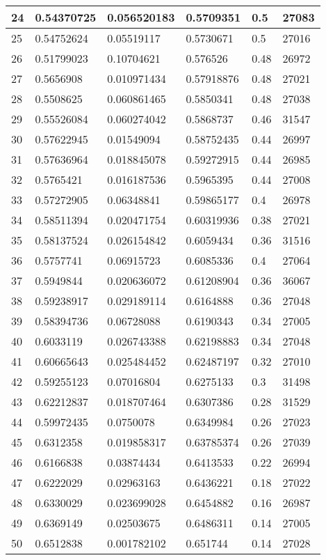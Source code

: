 \begin{longtable}{|l|l|l|l|l|l|}
24 & 0.54370725 & 0.056520183 & 0.5709351 & 0.5 & 27083 \\ \hline 
25 & 0.54752624 & 0.05519117 & 0.5730671 & 0.5 & 27016 \\ \hline 
26 & 0.51799023 & 0.10704621 & 0.576526 & 0.48 & 26972 \\ \hline 
27 & 0.5656908 & 0.010971434 & 0.57918876 & 0.48 & 27021 \\ \hline 
28 & 0.5508625 & 0.060861465 & 0.5850341 & 0.48 & 27038 \\ \hline 
29 & 0.55526084 & 0.060274042 & 0.5868737 & 0.46 & 31547 \\ \hline 
30 & 0.57622945 & 0.01549094 & 0.58752435 & 0.44 & 26997 \\ \hline 
31 & 0.57636964 & 0.018845078 & 0.59272915 & 0.44 & 26985 \\ \hline 
32 & 0.5765421 & 0.016187536 & 0.5965395 & 0.44 & 27008 \\ \hline 
33 & 0.57272905 & 0.06348841 & 0.59865177 & 0.4 & 26978 \\ \hline 
34 & 0.58511394 & 0.020471754 & 0.60319936 & 0.38 & 27021 \\ \hline 
35 & 0.58137524 & 0.026154842 & 0.6059434 & 0.36 & 31516 \\ \hline 
36 & 0.5757741 & 0.06915723 & 0.6085336 & 0.4 & 27064 \\ \hline 
37 & 0.5949844 & 0.020636072 & 0.61208904 & 0.36 & 36067 \\ \hline 
38 & 0.59238917 & 0.029189114 & 0.6164888 & 0.36 & 27048 \\ \hline 
39 & 0.58394736 & 0.06728088 & 0.6190343 & 0.34 & 27005 \\ \hline 
40 & 0.6033119 & 0.026743388 & 0.62198883 & 0.34 & 27048 \\ \hline 
41 & 0.60665643 & 0.025484452 & 0.62487197 & 0.32 & 27010 \\ \hline 
42 & 0.59255123 & 0.07016804 & 0.6275133 & 0.3 & 31498 \\ \hline 
43 & 0.62212837 & 0.018707464 & 0.6307386 & 0.28 & 31529 \\ \hline 
44 & 0.59972435 & 0.0750078 & 0.6349984 & 0.26 & 27023 \\ \hline 
45 & 0.6312358 & 0.019858317 & 0.63785374 & 0.26 & 27039 \\ \hline 
46 & 0.6166838 & 0.03874434 & 0.6413533 & 0.22 & 26994 \\ \hline 
47 & 0.6222029 & 0.02963163 & 0.6436221 & 0.18 & 27022 \\ \hline 
48 & 0.6330029 & 0.023699028 & 0.6454882 & 0.16 & 26987 \\ \hline 
49 & 0.6369149 & 0.02503675 & 0.6486311 & 0.14 & 27005 \\ \hline 
50 & 0.6512838 & 0.001782102 & 0.651744 & 0.14 & 27028 \\ \hline 
\end{longtable}